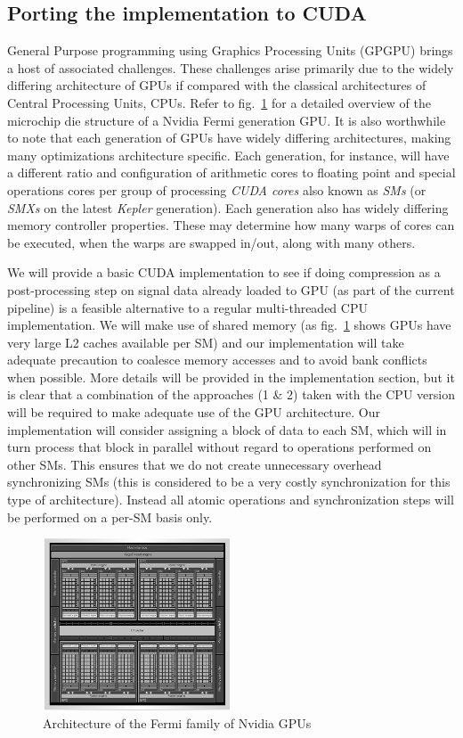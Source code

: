 \documentclass{acm_proc_article-sp}
\begin{document}
\subsection{Porting the implementation to CUDA}
General Purpose programming using Graphics Processing Units (GPGPU) brings a host of associated challenges. These challenges arise primarily due to the widely differing architecture of GPUs if compared
with the classical architectures of Central Processing Units, CPUs. Refer to fig.~\ref{FERMI_ARCH} for a detailed overview of the microchip die structure of a Nvidia Fermi generation GPU. It is also worthwhile to note 
that each generation of GPUs have widely differing architectures, making many optimizations architecture specific. Each generation, for instance, will have a different ratio and configuration of arithmetic cores to floating point
and special operations cores per group of processing \textit{CUDA cores} also known as \textit{SMs} (or \textit{SMXs} on the latest \textit{Kepler} generation). Each generation also has widely differing memory 
controller properties. These may determine how many warps of cores can be executed, when the warps are swapped in/out, along with many others. 

We will provide a basic CUDA implementation to see if doing compression as a post-processing step on signal data already loaded to GPU (as part of the current pipeline) is a feasible alternative to a regular 
multi-threaded CPU implementation. We will make use of shared memory (as fig.~\ref{FERMI_ARCH} shows GPUs have very large L2 caches available per SM) and our implementation will take adequate precaution to 
coalesce memory accesses and to avoid bank conflicts when possible. More details will be provided in the implementation section, but it is clear that a combination of the approaches (1 \& 2) taken with the CPU version 
will be required to make adequate use of the GPU architecture. Our implementation will consider assigning a block of data to each SM, which will in turn process that block in parallel without regard to operations 
performed on other SMs. This ensures that we do not create unnecessary overhead synchronizing SMs (this is considered to be a very costly synchronization for this type of architecture). Instead all atomic operations 
and synchronization steps will be performed on a per-SM basis only.
\begin{figure}[h!]
 \centering
 \includegraphics[width=0.50\textwidth]{fermi_arch.png}
 \caption{Architecture of the Fermi family of Nvidia GPUs \cite{wittenbrink2011fermi}}
 \label{FERMI_ARCH}
\end{figure}
\end{document}
